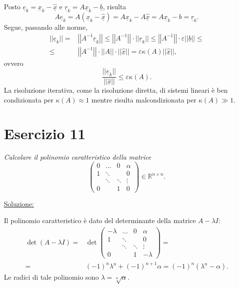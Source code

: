 Posto $\underline{e}_k=\underline{x}_k-\underline{\hat{x}}$ e $\underline{r}_k=A\underline{x}_k-\underline{b}$,
risulta $$A\underline{e}_k=A(\underline{x}_k-\underline{\hat{x}})=A\underline{x}_k-A\underline{\hat{x}}=A\underline{x}_k-b=\underline{r}_k.$$
Segue, passando alle norme, \begin{equation}\begin{split}||\underline{e}_k||=&\left|\left|A^{-1}\underline{r}_k\right|\right|\leq\left|\left|A^{-1}\right|\right|\cdot||\underline{r}_k||\leq\left|\left|A^{-1}\right|\right|\cdot\varepsilon||\underline{b}||\leq\\\leq&\left|\left|A^{-1}\right|\right|\cdot\left|\left|A\right|\right|\cdot||\underline{\hat{x}}||=\varepsilon\kappa(A)||\underline{\hat{x}}||,\end{split}\end{equation} ovvero $$\frac{||\underline{e}_k||}{||\underline{\hat{x}}||}\leq\varepsilon\kappa(A).$$
La risoluzione iterativa, come la risoluzione diretta, di sistemi lineari è ben condizionata per $\kappa(A)\approx 1$
mentre risulta malcondizionata per $\kappa(A)\gg 1$.

\section{Esercizio 11}
\label{sub:es11}
\emph{Calcolare il polinomio caratteristico della matrice
			\[
				\begin{pmatrix}
					0 & \dots & 0 & \alpha\\
					1 & \ddots & & 0\\
					& \ddots & \ddots & \vdots\\
					0 & & 1 & 0
				\end{pmatrix}\in\mathbb{R}^{n\times n}.
			\]}

\underline{Soluzione:}

\normalfont Il polinomio caratteristico è dato del determinante della matrice $A-\lambda I$:
			\begin{equation}\begin{split}\det{(A-\lambda I)}=&\det{
        \begin{pmatrix}-\lambda&\ldots&0&\alpha\\1&\ddots&&0\\&\ddots&\ddots&\vdots\\0&&1&-\lambda\end{pmatrix}}=\\
          =&(-1)^n\lambda^n+(-1)^{n+1}\alpha=(-1)^n(\lambda^n-\alpha).\end{split}\end{equation}
        Le radici di tale polinomio sono $\lambda=\sqrt[n]{\alpha}$.

